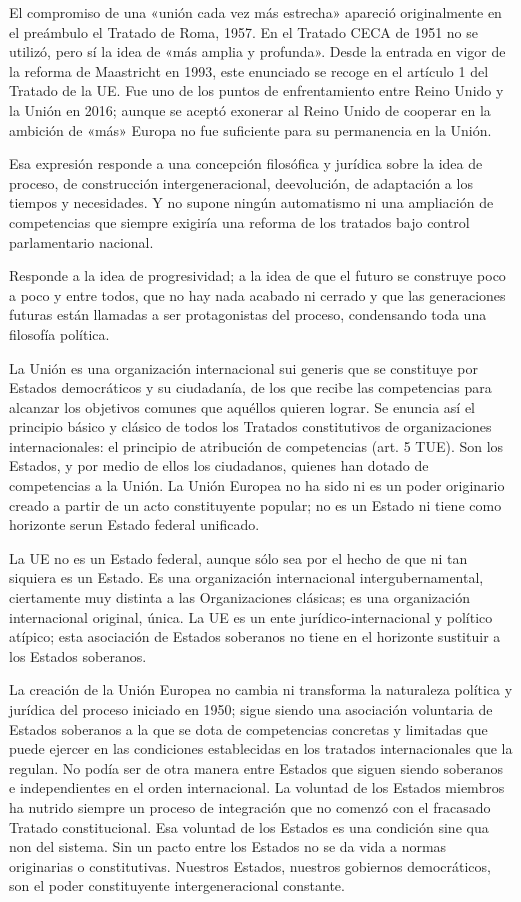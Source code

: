 \documentclass[10pt,a4paper]{article}
\begin{document}
El compromiso de una «unión cada vez más estrecha» apareció originalmente en el preámbulo el Tratado de Roma, 1957. En el Tratado CECA de 1951 no se utilizó, pero sí la idea de «más amplia y profunda». Desde la entrada en vigor de la reforma de Maastricht en 1993, este enunciado se recoge en el artículo 1 del Tratado de la UE. Fue uno de los puntos de enfrentamiento entre Reino Unido y la Unión en 2016; aunque se aceptó exonerar al Reino Unido de cooperar en la ambición de «más» Europa no fue suficiente para su permanencia en la Unión. 

Esa expresión responde a una concepción filosófica y jurídica sobre la idea de proceso, de construcción intergeneracional, deevolución, de adaptación a los tiempos y necesidades. Y no supone ningún automatismo ni una ampliación de competencias que siempre exigiría una reforma de los tratados bajo control parlamentario nacional.

Responde a la idea de progresividad; a la idea de que el futuro se construye poco a poco y entre todos, que no hay nada acabado ni cerrado y que las generaciones futuras están llamadas a ser protagonistas del proceso, condensando toda una filosofía política.

La Unión es una organización internacional sui generis que se constituye por Estados democráticos y su ciudadanía, de los que recibe las competencias para alcanzar los objetivos comunes que aquéllos quieren lograr. Se enuncia así el principio básico y clásico de todos los Tratados constitutivos de organizaciones internacionales: el principio de atribución de competencias (art. 5 TUE). Son los Estados, y por medio de ellos los ciudadanos, quienes han dotado de competencias a la Unión. La Unión Europea no ha sido ni es un poder originario creado a partir de un acto constituyente popular; no es un Estado ni tiene como horizonte serun Estado federal unificado.

La UE no es un Estado federal, aunque sólo sea por el hecho de que ni tan siquiera es un Estado. Es una organización internacional intergubernamental, ciertamente muy distinta a las Organizaciones clásicas; es una organización internacional original, única. La UE es un ente jurídico-internacional y político atípico; esta asociación de Estados soberanos no tiene en el horizonte sustituir a los Estados soberanos.

La creación de la Unión Europea no cambia ni transforma la naturaleza política y jurídica del proceso iniciado en 1950; sigue siendo una asociación voluntaria de Estados soberanos a la que se dota de competencias concretas y limitadas que puede ejercer en las condiciones establecidas en los tratados internacionales que la regulan. No podía ser de otra manera entre Estados que siguen siendo soberanos e independientes en el orden internacional. La voluntad de los Estados miembros ha nutrido siempre un proceso de integración que no comenzó con el fracasado Tratado constitucional. Esa voluntad de los Estados es una condición sine qua non del sistema. Sin un pacto entre los Estados no se da vida a normas originarias o constitutivas. Nuestros Estados, nuestros gobiernos democráticos, son el poder constituyente intergeneracional constante.
\end{document}
